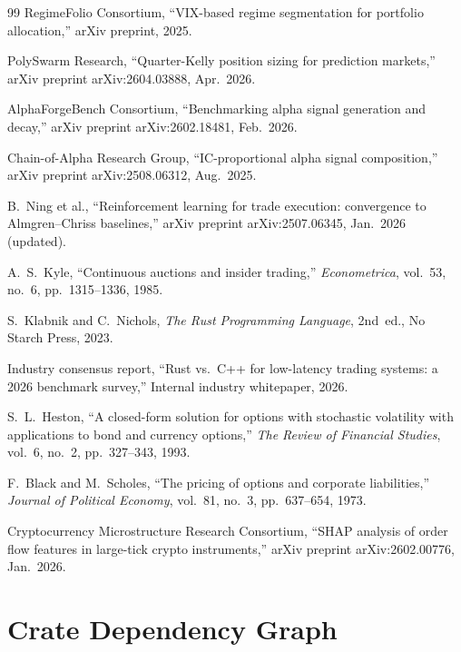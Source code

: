 \documentclass[11pt]{article}
\theoremstyle{definition}
\begin{document}
\begin{thebibliography}{99}
RegimeFolio Consortium,
``VIX-based regime segmentation for portfolio allocation,''
arXiv preprint, 2025.

PolySwarm Research,
``Quarter-Kelly position sizing for prediction markets,''
arXiv preprint arXiv:2604.03888, Apr.~2026.

AlphaForgeBench Consortium,
``Benchmarking alpha signal generation and decay,''
arXiv preprint arXiv:2602.18481, Feb.~2026.

Chain-of-Alpha Research Group,
``IC-proportional alpha signal composition,''
arXiv preprint arXiv:2508.06312, Aug.~2025.

B.~Ning et al.,
``Reinforcement learning for trade execution: convergence to
Almgren--Chriss baselines,''
arXiv preprint arXiv:2507.06345, Jan.~2026 (updated).

A.~S.~Kyle,
``Continuous auctions and insider trading,''
\textit{Econometrica}, vol.~53, no.~6, pp.~1315--1336, 1985.

S.~Klabnik and C.~Nichols,
\textit{The Rust Programming Language}, 2nd~ed.,
No Starch Press, 2023.

Industry consensus report,
``Rust vs.\ C++ for low-latency trading systems: a 2026 benchmark
survey,''
Internal industry whitepaper, 2026.

S.~L.~Heston,
``A closed-form solution for options with stochastic volatility
with applications to bond and currency options,''
\textit{The Review of Financial Studies}, vol.~6, no.~2,
pp.~327--343, 1993.

F.~Black and M.~Scholes,
``The pricing of options and corporate liabilities,''
\textit{Journal of Political Economy}, vol.~81, no.~3,
pp.~637--654, 1973.

Cryptocurrency Microstructure Research Consortium,
``SHAP analysis of order flow features in large-tick crypto
instruments,''
arXiv preprint arXiv:2602.00776, Jan.~2026.

\end{thebibliography}

\appendix
\section{Crate Dependency Graph}
\label{app:deps}
\end{document}
